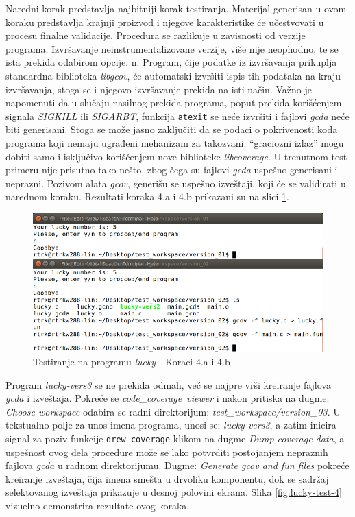 \documentclass[12pt,oneside]{memoir}
\newcommand{\kod}[1]{\texttt{#1}}
\newcommand{\strano}[1]{\textit{#1}}
\begin{document}
Naredni korak predstavlja najbitniji korak testiranja. Materijal generisan u ovom koraku predstavlja krajnji proizvod i njegove karakteristike će učestvovati u procesu finalne validacije. Procedura se razlikuje u zavisnosti od verzije programa. Izvršavanje neinstrumentalizovane verzije, više nije neophodno, te se ista prekida odabirom opcije: n. Program, čije podatke iz izvršavanja prikuplja standardna biblioteka \strano{libgcov}, će automatski izvršiti ispis tih podataka na kraju izvršavanja, stoga se i njegovo izvršavanje prekida na isti način. Važno je napomenuti da u slučaju nasilnog prekida programa, poput prekida korišćenjem signala \strano{SIGKILL} ili \strano{SIGARBT}, funkcija \kod{atexit} se neće izvršiti i fajlovi \strano{gcda} neće biti generisani. Stoga se može jasno zaključiti da se podaci o pokrivenosti koda programa koji nemaju ugrađeni mehanizam za takozvani: “graciozni izlaz” mogu dobiti samo i isključivo korišćenjem nove biblioteke \strano{libcoverage}. U trenutnom test primeru nije prisutno tako nešto, zbog čega su fajlovi \strano{gcda} uspešno generisani i neprazni. Pozivom alata \strano{gcov}, generišu se uspešno izveštaji, koji će se validirati u narednom koraku. Rezultati koraka 4.a i 4.b prikazani su na slici \ref{fig:lucky-test-3}.

\begin{figure}[!ht]
  \centering
  \includegraphics[width=\textwidth]{img/lucky3-ng.png}
  \caption{Testiranje na programu \strano{lucky} - Koraci 4.a i 4.b}
  \label{fig:lucky-test-3}
\end{figure}

Program \strano{lucky-vers3} se ne prekida odmah, već se najpre vrši kreiranje fajlova \strano{gcda} i izveštaja. Pokreće se \strano{code\_coverage\ viewer} i nakon pritiska na dugme: \strano{Choose workspace} odabira se radni direktorijum: \strano{test\_workspace/version\_03}. U tekstualno polje za unos imena programa, unosi se: \strano{lucky-vers3}, a zatim inicira signal za poziv funkcije \kod{drew\_coverage} klikom na dugme \strano{Dump coverage data}, a uspešnost ovog dela procedure može se lako potvrditi postojanjem nepraznih fajlova \strano{gcda} u radnom direktorijumu. Dugme: \strano{Generate gcov and fun files} pokreće kreiranje izveštaja, čija imena smešta u drvoliku komponentu, dok se sadržaj selektovanog izveštaja prikazuje u desnoj polovini ekrana. Slika \ref{fig:lucky-test-4} vizuelno demonstrira rezultate ovog koraka.
\end{document}
